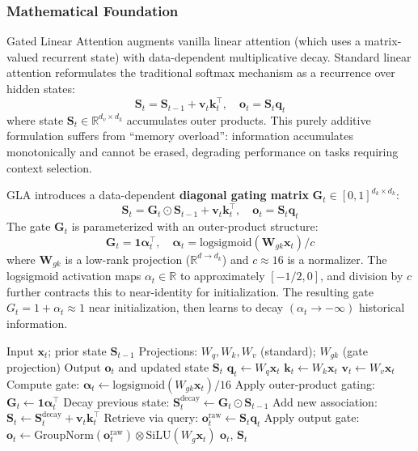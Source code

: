 \subsubsection{Mathematical Foundation}

Gated Linear Attention \citep{yang_gla_2023} augments vanilla linear attention (which uses a matrix-valued recurrent state) with data-dependent multiplicative decay. Standard linear attention reformulates the traditional softmax mechanism as a recurrence over hidden states:
\[
\mathbf{S}_t = \mathbf{S}_{t-1} + \mathbf{v}_t \mathbf{k}_t^\top, \quad \mathbf{o}_t = \mathbf{S}_t \mathbf{q}_t
\]
where state $\mathbf{S}_t \in \mathbb{R}^{d_v \times d_k}$ accumulates outer products. This purely additive formulation suffers from ``memory overload'': information accumulates monotonically and cannot be erased, degrading performance on tasks requiring context selection.

GLA introduces a data-dependent \textbf{diagonal gating matrix} $\mathbf{G}_t \in [0,1]^{d_k \times d_k}$:
\[
\mathbf{S}_t = \mathbf{G}_t \odot \mathbf{S}_{t-1} + \mathbf{v}_t \mathbf{k}_t^\top, \quad \mathbf{o}_t = \mathbf{S}_t \mathbf{q}_t
\]
The gate $\mathbf{G}_t$ is parameterized with an outer-product structure:
\[
\mathbf{G}_t = \mathbf{1} \boldsymbol{\alpha}_t^\top, \quad \boldsymbol{\alpha}_t = \text{logsigmoid}\left(\mathbf{W}_{gk} \mathbf{x}_t\right) / c
\]
where $\mathbf{W}_{gk}$ is a low-rank projection ($\mathbb{R}^{d \to d_k}$) and $c \approx 16$ is a normalizer. The logsigmoid activation maps $\alpha_t \in \mathbb{R}$ to approximately $[-1/2, 0]$, and division by $c$ further contracts this to near-identity for initialization. The resulting gate $G_t = 1 + \alpha_t \approx 1$ near initialization, then learns to decay $(\alpha_t \to -\infty)$ historical information.

\begin{algorithm}[H]
\caption{Gated Linear Attention (Recurrent Form)}
\begin{algorithmic}[1]
\Require Input $\mathbf{x}_t$; prior state $\mathbf{S}_{t-1}$
\Require Projections: $W_q, W_k, W_v$ (standard); $W_{gk}$ (gate projection)
\Ensure Output $\mathbf{o}_t$ and updated state $\mathbf{S}_t$
\State $\mathbf{q}_t \gets W_q \mathbf{x}_t$
\State $\mathbf{k}_t \gets W_k \mathbf{x}_t$
\State $\mathbf{v}_t \gets W_v \mathbf{x}_t$
\State Compute gate: $\boldsymbol{\alpha}_t \gets \text{logsigmoid}(W_{gk} \mathbf{x}_t) / 16$ 
\State Apply outer-product gating: $\mathbf{G}_t \gets \mathbf{1} \boldsymbol{\alpha}_t^\top$  
\State Decay previous state: $\mathbf{S}_t^\text{decay} \gets \mathbf{G}_t \odot \mathbf{S}_{t-1}$ 
\State Add new association: $\mathbf{S}_t \gets \mathbf{S}_t^\text{decay} + \mathbf{v}_t \mathbf{k}_t^\top$
\State Retrieve via query: $\mathbf{o}_t^\text{raw} \gets \mathbf{S}_t \mathbf{q}_t$
\State Apply output gate: $\mathbf{o}_t \gets \text{GroupNorm}(\mathbf{o}_t^\text{raw}) \otimes \text{SiLU}(W_g \mathbf{x}_t)$
\Return $\mathbf{o}_t$, $\mathbf{S}_t$
\end{algorithmic}
\end{algorithm}

